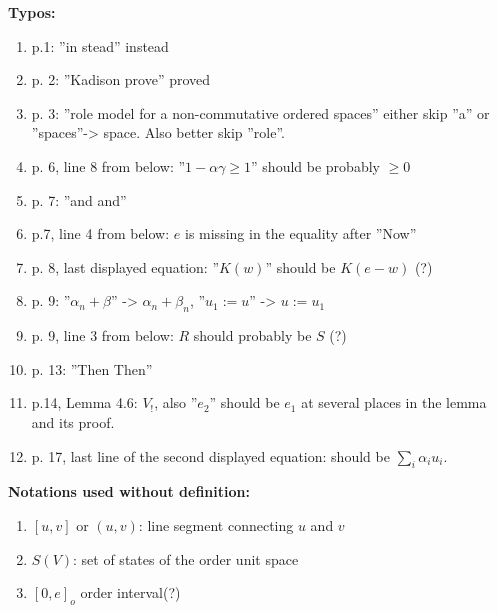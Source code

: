 \documentclass[12pt]{article}
\begin{document}
\noindent
\textbf{Typos:}

\begin{enumerate}
\item p.1: ''in stead'' instead
\item p. 2: ''Kadison prove'' proved
\item p. 3: ''role model for a non-commutative ordered spaces'' either skip ''a'' or
''spaces''-> space. Also better skip ''role''.
\item p. 6, line 8 from below: ''$1-\alpha\gamma\ge 1$'' should be probably $\ge 0$


\item p. 7: ''and and''
\item p.7, line 4 from below: $e$ is missing in the equality after ''Now''
\item p. 8, last displayed equation: ''$K(w)$'' should be $K(e-w)$ (?)
\item p. 9:  ''$\alpha_n+\beta$'' -> $\alpha_n+\beta_n$, 
''$u_1:=u$'' -> $u:=u_1$
\item p. 9, line 3 from below: $R$ should probably be $S$ (?)
\item p. 13: ''Then Then''
\item p.14, Lemma 4.6: $V_!$, also ''$e_2$'' should be $e_1$ at several places in the
lemma and its proof.
\item p. 17, last line of the second displayed equation: should be $\sum_i \alpha_i u_i$.




\end{enumerate}

\noindent
\textbf{Notations used without definition:}

\begin{enumerate}
\item $[u,v]$ or $(u,v)$: line segment connecting $u$ and $v$
\item $S(V)$: set of states of the order unit space
\item $[0,e]_o$ order interval(?)
\end{enumerate}
\end{document}

